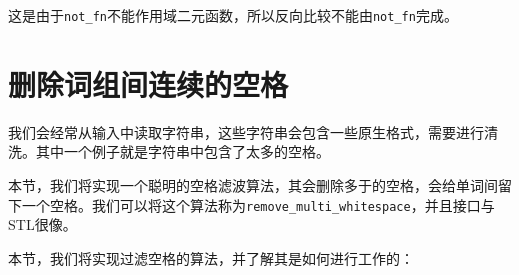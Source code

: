 这是由于\texttt{not\_fn}不能作用域二元函数，所以反向比较不能由\texttt{not\_fn}完成。


\section{删除词组间连续的空格}

我们会经常从输入中读取字符串，这些字符串会包含一些原生格式，需要进行清洗。其中一个例子就是字符串中包含了太多的空格。

本节，我们将实现一个聪明的空格滤波算法，其会删除多于的空格，会给单词间留下一个空格。我们可以将这个算法称为\texttt{remove\_multi\_whitespace}，并且接口与STL很像。


本节，我们将实现过滤空格的算法，并了解其是如何进行工作的：

